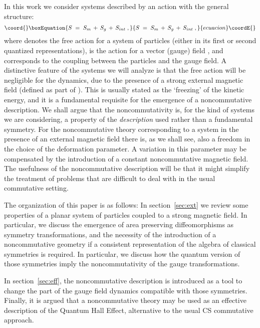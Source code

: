 \documentclass[a4paper,12pt]{article}
\begin{document}
In this work we consider systems described by an action with the
general structure:
\begin{equation}\coord{}\boxEquation{
  \label{eq:defact}
S \;=\; S_m \,+\, S_g \,+\, S_{int} \;,
}{
  S \;=\; S_m \,+\, S_g \,+\, S_{int} \;,
}{ecuacion}\coordE{}\end{equation}
where \coordHE{} denotes the free action for a system of particles
(either
in its first or second quantized representations), \coordHE{} is the
action
for a vector (gauge) field \coordHE{}, and \coordHE{} corresponds to
the
coupling between the particles and the gauge field. A distinctive
feature of the systems we will analyze is that the free action
\coordHE{}
will be negligible for the dynamics, due to the presence of a
strong
external magnetic field (defined as part of \coordHE{}). This is
usually stated as the `freezing' of the kinetic energy, and it is a
fundamental requisite for the emergence of a noncommutative
description. We shall argue that the noncommutativity is, for the
kind
of systems we are considering, a property of the {\em
description\/}
used rather than a fundamental symmetry. For the noncommutative
theory
corresponding to a system in the presence of an external magnetic
field there is, as we shall see, also a freedom in the choice of
the
deformation parameter. A variation in this parameter may be
compensated by the introduction of a constant noncommutative
magnetic
field. The usefulness of the noncommutative description will be
that
it might simplify the treatment of problems that are difficult to
deal
with in the usual commutative setting.
  

The organization of this paper is as follows: In
section~\ref{sec:ext}
we review some properties of a planar system of particles coupled
to a
strong magnetic field. In particular, we discuss the emergence of
area
preserving diffeomorphisms as symmetry transformations, and the
necessity of the introduction of a noncommutative geometry if a
consistent representation of the algebra of classical symmetries is
required. In particular, we discuss how the quantum version of
those
symmetries imply the noncommutativity of the gauge transformations.

In section~\ref{sec:eff}, the noncommutative description is
introduced
as a tool to change the part of the gauge field dynamics compatible
with those symmetries.  Finally, it is argued that a noncommutative
theory may be used as an effective description of the Quantum Hall
Effect, alternative to the usual CS commutative approach.
\end{document}
